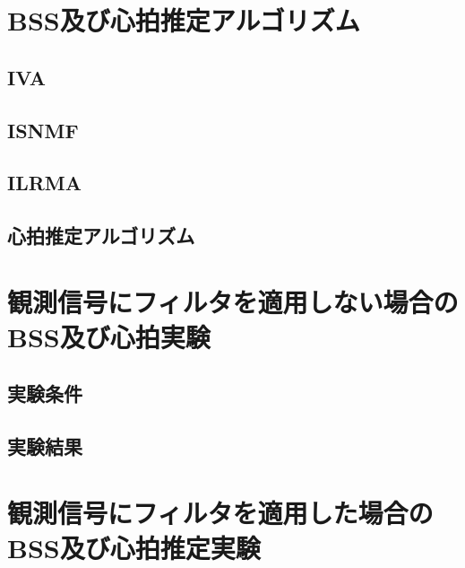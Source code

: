 \documentclass[11pt]{jarticle}
\begin{document}
\section{BSS及び心拍推定アルゴリズム}
\hspace{1.0em}

\subsection{IVA}
\hspace{1.0em}

\subsection{ISNMF}
\hspace{1.0em}

\subsection{ILRMA}
\hspace{1.0em}

\subsection{心拍推定アルゴリズム}
\hspace{1.0em}

\section{観測信号にフィルタを適用しない場合のBSS及び心拍実験}
\hspace{1.0em}

\subsection{実験条件}
\hspace{1.0em}

\subsection{実験結果}
\hspace{1.0em}

\section{観測信号にフィルタを適用した場合のBSS及び心拍推定実験}
\hspace{1.0em}
\end{document}
